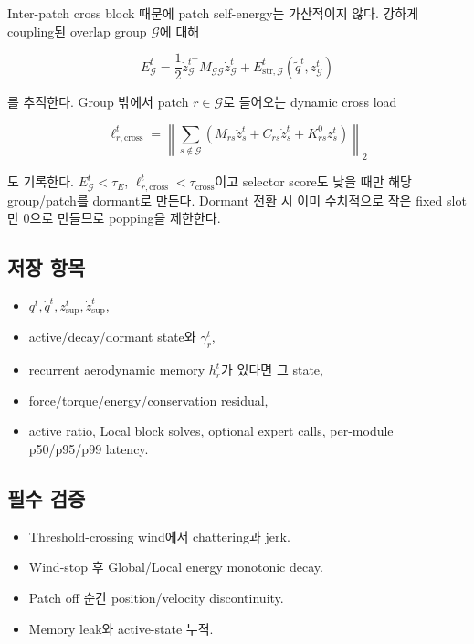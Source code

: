 \documentclass[11pt,a4paper]{article}
\begin{document}
Inter-patch cross block 때문에 patch self-energy는 가산적이지 않다.
강하게 coupling된 overlap group \(\mathcal G\)에 대해

\begin{equation}
  E_{\mathcal G}^t
  =
  \frac12\dot z_{\mathcal G}^{t\top}
  M_{\mathcal G\mathcal G}\dot z_{\mathcal G}^t
  +E_{\mathrm{str},\mathcal G}^t
  (\widetilde q^t,z_{\mathcal G}^t)
\end{equation}

를 추적한다. Group 밖에서 patch \(r\in\mathcal G\)로 들어오는 dynamic cross load

\begin{equation}
  \ell_{r,\mathrm{cross}}^t
  =
  \left\|
  \sum_{s\notin\mathcal G}
  (M_{rs}\ddot z_s^t+C_{rs}\dot z_s^t+K_{rs}^{0}z_s^t)
  \right\|_2
\end{equation}

도 기록한다. \(E_{\mathcal G}^t<\tau_E\),
\(\ell_{r,\mathrm{cross}}^t<\tau_{\mathrm{cross}}\)이고 selector score도 낮을 때만
해당 group/patch를 dormant로 만든다.
Dormant 전환 시 이미 수치적으로 작은 fixed slot만 0으로 만들므로 popping을 제한한다.

\subsection*{저장 항목}

\begin{itemize}[leftmargin=1.5em]
  \item \(q^t,\dot q^t,z_{\mathrm{sup}}^t,\dot z_{\mathrm{sup}}^t\),
  \item active/decay/dormant state와 \(\gamma_r^t\),
  \item recurrent aerodynamic memory \(h_r^t\)가 있다면 그 state,
  \item force/torque/energy/conservation residual,
  \item active ratio, Local block solves, optional expert calls, per-module p50/p95/p99 latency.
\end{itemize}

\subsection*{필수 검증}

\begin{itemize}[leftmargin=1.5em]
  \item Threshold-crossing wind에서 chattering과 jerk.
  \item Wind-stop 후 Global/Local energy monotonic decay.
  \item Patch off 순간 position/velocity discontinuity.
  \item Memory leak와 active-state 누적.
\end{itemize}
\end{document}
